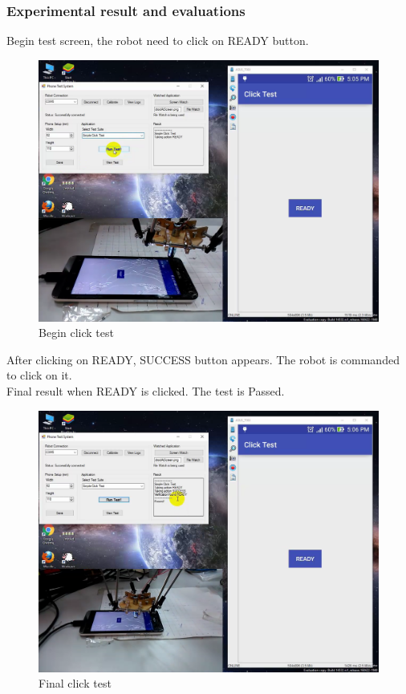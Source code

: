 \subsubsection{Experimental result and evaluations}
Begin test screen, the robot need to click on READY button.
	\begin{figure}[H]
		\centering
		\includegraphics[width=\maxwidth{15cm}, keepaspectratio]{Chapters/Fig/click_start.png}
		\caption{Begin click test}
		\label{fig:click_start}
	\end{figure}
After clicking on READY, SUCCESS button appears. The robot is commanded to click on it. \\
Final result when READY is clicked. The test is Passed.
	\begin{figure}[H]
		\centering
		\includegraphics[width=\maxwidth{15cm}, keepaspectratio]{Chapters/Fig/click_final.png}
		\caption{Final click test}
		\label{fig:click_final}
	\end{figure}
